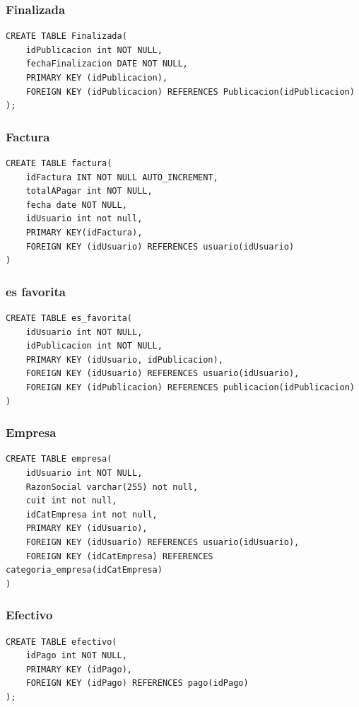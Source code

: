 \documentclass[a4paper, 10pt, twoside]{article}
\begin{document}
\subsubsection{Finalizada}
\begin{verbatim}
CREATE TABLE Finalizada(
	idPublicacion int NOT NULL,
	fechaFinalizacion DATE NOT NULL,
	PRIMARY KEY (idPublicacion),
    FOREIGN KEY (idPublicacion) REFERENCES Publicacion(idPublicacion)
);

\end{verbatim}
\subsubsection{Factura}
\begin{verbatim}
CREATE TABLE factura(
	idFactura INT NOT NULL AUTO_INCREMENT,
	totalAPagar int NOT NULL,
    fecha date NOT NULL,
    idUsuario int not null,
    PRIMARY KEY(idFactura),
    FOREIGN KEY (idUsuario) REFERENCES usuario(idUsuario)
)
\end{verbatim}
\subsubsection{es favorita}
\begin{verbatim}
CREATE TABLE es_favorita(
	idUsuario int NOT NULL,
    idPublicacion int NOT NULL,
    PRIMARY KEY (idUsuario, idPublicacion),
    FOREIGN KEY (idUsuario) REFERENCES usuario(idUsuario),
    FOREIGN KEY (idPublicacion) REFERENCES publicacion(idPublicacion)
)
\end{verbatim}
\subsubsection{Empresa}
\begin{verbatim}
CREATE TABLE empresa(
	idUsuario int NOT NULL,
    RazonSocial varchar(255) not null,
    cuit int not null,
	idCatEmpresa int not null,
    PRIMARY KEY (idUsuario),
    FOREIGN KEY (idUsuario) REFERENCES usuario(idUsuario),
    FOREIGN KEY (idCatEmpresa) REFERENCES categoria_empresa(idCatEmpresa)
)
\end{verbatim}
\subsubsection{Efectivo}
\begin{verbatim}
CREATE TABLE efectivo(
	idPago int NOT NULL,
	PRIMARY KEY (idPago),
    FOREIGN KEY (idPago) REFERENCES pago(idPago)
);
\end{verbatim}
\end{document}
